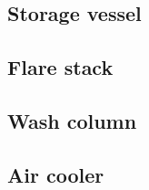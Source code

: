 \subsection{Storage vessel}

\subsection{Flare stack}

\subsection{Wash column}

\subsection{Air cooler}


